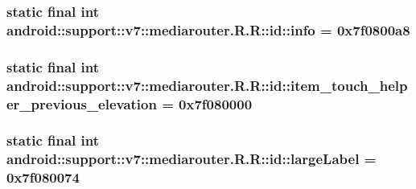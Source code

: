 \hypertarget{classandroid_1_1support_1_1v7_1_1mediarouter_1_1_r_1_1id_0fc8346daa357da794b6a0e2f4829563}{
\subsubsection[{info}]{\setlength{\rightskip}{0pt plus 5cm}static final int android::support::v7::mediarouter.R.R::id::info = 0x7f0800a8}}
\label{classandroid_1_1support_1_1v7_1_1mediarouter_1_1_r_1_1id_0fc8346daa357da794b6a0e2f4829563}


\hypertarget{classandroid_1_1support_1_1v7_1_1mediarouter_1_1_r_1_1id_3286093ad8b543d7a816758b7e6630c4}{
\subsubsection[{item\_\-touch\_\-helper\_\-previous\_\-elevation}]{\setlength{\rightskip}{0pt plus 5cm}static final int android::support::v7::mediarouter.R.R::id::item\_\-touch\_\-helper\_\-previous\_\-elevation = 0x7f080000}}
\label{classandroid_1_1support_1_1v7_1_1mediarouter_1_1_r_1_1id_3286093ad8b543d7a816758b7e6630c4}


\hypertarget{classandroid_1_1support_1_1v7_1_1mediarouter_1_1_r_1_1id_122d04fbacd2f47d435d2c90a25dc65d}{
\subsubsection[{largeLabel}]{\setlength{\rightskip}{0pt plus 5cm}static final int android::support::v7::mediarouter.R.R::id::largeLabel = 0x7f080074}}
\label{classandroid_1_1support_1_1v7_1_1mediarouter_1_1_r_1_1id_122d04fbacd2f47d435d2c90a25dc65d}


